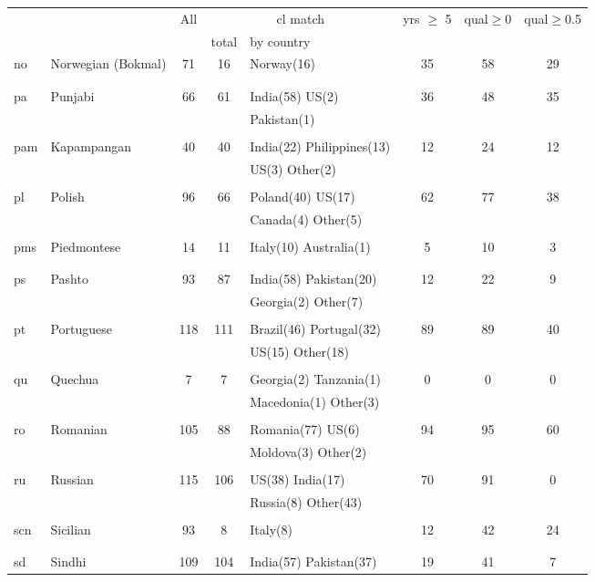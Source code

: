 \begin{figure}[h]
\centering
\begin{tabular}{llcclccc}
&&All&\multicolumn{2}{c}{cl match}&yrs $\geq$ 5&qual$\geq$0&qual$\geq$0.5\\
&&&total&by country&&\\
\hline\hline
no&Norwegian (Bokmal)&71&16&Norway(16) &35&58&29\\
&&&&&&&\\
&&&&&&&\\
pa&Punjabi&66&61&India(58) US(2) &36&48&35\\
&&&&Pakistan(1) &&&\\
&&&&&&&\\
pam&Kapampangan&40&40&India(22) Philippines(13) &12&24&12\\
&&&&US(3) Other(2) &&&\\
&&&&&&&\\
pl&Polish&96&66&Poland(40) US(17) &62&77&38\\
&&&&Canada(4) Other(5) &&&\\
&&&&&&&\\
pms&Piedmontese&14&11&Italy(10) Australia(1) &5&10&3\\
&&&&&&&\\
&&&&&&&\\
ps&Pashto&93&87&India(58) Pakistan(20) &12&22&9\\
&&&&Georgia(2) Other(7) &&&\\
&&&&&&&\\
pt&Portuguese&118&111&Brazil(46) Portugal(32) &89&89&40\\
&&&&US(15) Other(18) &&&\\
&&&&&&&\\
qu&Quechua&7&7&Georgia(2) Tanzania(1) &0&0&0\\
&&&&Macedonia(1) Other(3) &&&\\
&&&&&&&\\
ro&Romanian&105&88&Romania(77) US(6) &94&95&60\\
&&&&Moldova(3) Other(2) &&&\\
&&&&&&&\\
ru&Russian&115&106&US(38) India(17) &70&91&0\\
&&&&Russia(8) Other(43) &&&\\
&&&&&&&\\
scn&Sicilian&93&8&Italy(8) &12&42&24\\
&&&&&&&\\
&&&&&&&\\
sd&Sindhi&109&104&India(57) Pakistan(37) &19&41&7\\

\end{tabular}
\end{figure}
